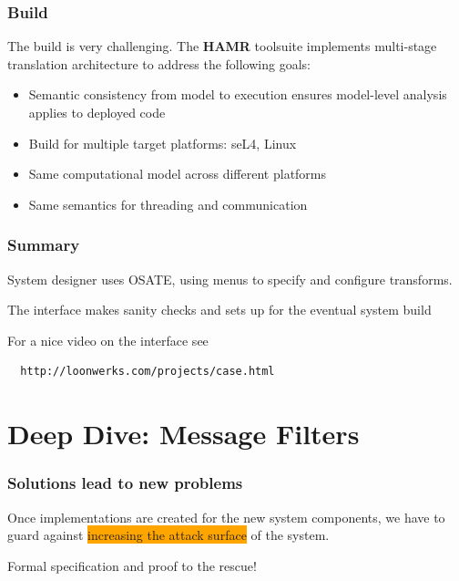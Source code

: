 \documentclass{beamer}
\newcommand{\kemph}[1]{\colorbox{orange}{#1}}
\begin{document}
\begin{frame}\frametitle{Build}

The build is very challenging. The \textbf{HAMR} toolsuite implements
multi-stage translation architecture to address the following goals:
\begin{itemize}

\item Semantic consistency from model to execution ensures model-level
  analysis applies to deployed code

\item Build for multiple target platforms: seL4, Linux

\item Same computational model across different platforms

\item Same semantics for threading and communication

\end{itemize}

\end{frame}

\begin{frame}[fragile]\frametitle{Summary}

System designer uses OSATE, using menus to specify and configure transforms.

The interface makes sanity checks and sets up for the eventual system build

For a nice video on the interface see
\begin{verbatim}
  http://loonwerks.com/projects/case.html
\end{verbatim}

\end{frame}

\section {Deep Dive: Message Filters}

\begin{frame}\frametitle{Solutions lead to new problems}

Once implementations are created for the new system components, we
have to guard against \kemph{increasing the attack surface} of the system.

Formal specification and proof to the rescue!

\end{frame}
\end{document}

